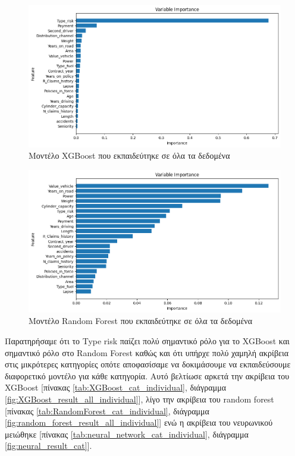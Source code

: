 \documentclass{llncs}
\begin{document}
\begin{figure}
    \begin{center}
        \includegraphics[width=1\textwidth]{images/feature_importance_combined_xgb.png}
    \end{center}
    \caption{Μοντέλο XGBoost που εκπαιδεύτηκε σε όλα τα δεδομένα}  
    \label{fig:XGBoost_all_feature_importance}  
\end{figure}

\begin{figure}
    \begin{center}
        \includegraphics[width=1\textwidth]{images/feature_importance_combined_random_forest.png}
    \end{center}
    \caption{Μοντέλο Random Forest που εκπαιδεύτηκε σε όλα τα δεδομένα}  
    \label{fig:random_forest_all_feature_importance}  
\end{figure}

Παρατηρήσαμε ότι το Type risk παίζει πολύ σημαντικό ρόλο για το XGBoost και σημαντικό ρόλο στο
Random Forest καθώς και ότι υπήρχε πολύ χαμηλή ακρίβεια στις μικρότερες κατηγορίες οπότε
αποφασίσαμε να δοκιμάσουμε να εκπαιδεύσουμε διαφορετικό μοντέλο για κάθε κατηγορία. Αυτό βελτίωσε αρκετά την ακρίβεια 
του XGBoost [πίνακας \ref{tab:XGBoost_cat_individual}, διάγραμμα \ref{fig:XGBoost_result_all_individual}], 
λίγο την ακρίβεια του random forest [πίνακας \ref{tab:RandomForest_cat_individual}, διάγραμμα \ref{fig:random_forest_result_all_individual}] 
ενώ η ακρίβεια του νευρωνικού μειώθηκε [πίνακας \ref{tab:neural_network_cat_individual}, διάγραμμα \ref{fig:neural_result_cat}].
\end{document}
